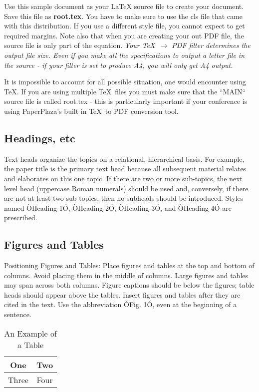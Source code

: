 \documentclass[letterpaper, 10 pt, conference]{ieeeconf}   %
\begin{document}
Use this sample document as your LaTeX source file to create your document. Save this file as {\bf root.tex}. You have to make sure to use the cls file that came with this distribution. If you use a different style file, you cannot expect to get required margins. Note also that when you are creating your out PDF file, the source file is only part of the equation. {\it Your \TeX\ $\rightarrow$ PDF filter determines the output file size. Even if you make all the specifications to output a letter file in the source - if your filter is set to produce A4, you will only get A4 output. }

It is impossible to account for all possible situation, one would encounter using \TeX. If you are using multiple \TeX\ files you must make sure that the ``MAIN`` source file is called root.tex - this is particularly important if your conference is using PaperPlaza's built in \TeX\ to PDF conversion tool.

\subsection{Headings, etc}

Text heads organize the topics on a relational, hierarchical basis. For example, the paper title is the primary text head because all subsequent material relates and elaborates on this one topic. If there are two or more sub-topics, the next level head (uppercase Roman numerals) should be used and, conversely, if there are not at least two sub-topics, then no subheads should be introduced. Styles named ÒHeading 1Ó, ÒHeading 2Ó, ÒHeading 3Ó, and ÒHeading 4Ó are prescribed.

\subsection{Figures and Tables}

Positioning Figures and Tables: Place figures and tables at the top and bottom of columns. Avoid placing them in the middle of columns. Large figures and tables may span across both columns. Figure captions should be below the figures; table heads should appear above the tables. Insert figures and tables after they are cited in the text. Use the abbreviation ÒFig. 1Ó, even at the beginning of a sentence.

\begin{table}[h]
	\caption{An Example of a Table}
	\label{table_example}
	\begin{center}
		\begin{tabular}{|c||c|}
			\hline
			One   & Two  \\
			\hline
			Three & Four \\
			\hline
		\end{tabular}
	\end{center}
\end{table}
\end{document}
